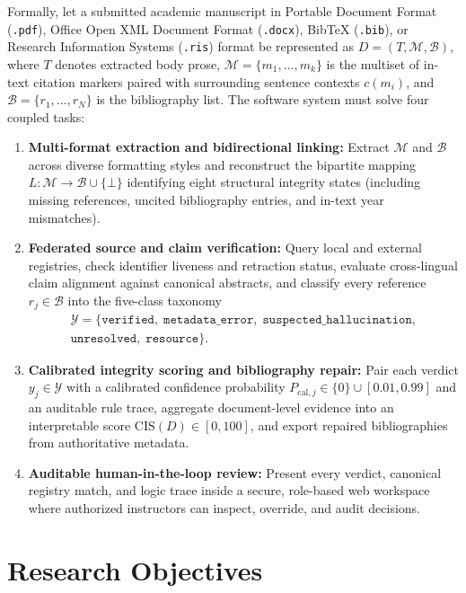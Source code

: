 Formally, let a submitted academic manuscript in Portable Document Format (\texttt{.pdf}), Office Open XML Document Format (\texttt{.docx}), BibTeX (\texttt{.bib}), or Research Information Systems (\texttt{.ris}) format be represented as $D = (T, \mathcal{M}, \mathcal{B})$, where $T$ denotes extracted body prose, $\mathcal{M} = \{m_1, \dots, m_k\}$ is the multiset of in-text citation markers paired with surrounding sentence contexts $c(m_i)$, and $\mathcal{B} = \{r_1, \dots, r_N\}$ is the bibliography list. The software system must solve four coupled tasks:
\begin{enumerate}
    \item \textbf{Multi-format extraction and bidirectional linking:} Extract $\mathcal{M}$ and $\mathcal{B}$ across diverse formatting styles and reconstruct the bipartite mapping $L: \mathcal{M} \to \mathcal{B} \cup \{\bot\}$ identifying eight structural integrity states (including missing references, uncited bibliography entries, and in-text year mismatches).
    \item \textbf{Federated source and claim verification:} Query local and external registries, check identifier liveness and retraction status, evaluate cross-lingual claim alignment against canonical abstracts, and classify every reference $r_j \in \mathcal{B}$ into the five-class taxonomy
    \[\begin{gathered}
    \mathcal{Y} = \{\texttt{verified},\; \texttt{metadata\_error},\; \texttt{suspected\_hallucination},\\
    \texttt{unresolved},\; \texttt{resource}\}.
    \end{gathered}\]
    \item \textbf{Calibrated integrity scoring and bibliography repair:} Pair each verdict $y_j \in \mathcal{Y}$ with a calibrated confidence probability $P_{\text{cal},j} \in \{0\} \cup [0.01, 0.99]$ and an auditable rule trace, aggregate document-level evidence into an interpretable score $\mathrm{CIS}(D) \in [0, 100]$, and export repaired bibliographies from authoritative metadata.
    \item \textbf{Auditable human-in-the-loop review:} Present every verdict, canonical registry match, and logic trace inside a secure, role-based web workspace where authorized instructors can inspect, override, and audit decisions.
\end{enumerate}

\section{Research Objectives}
\label{sec:objectives}

